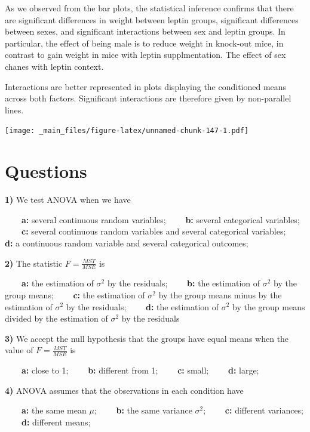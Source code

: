 \documentclass[
]{book}
\begin{document}
As we observed from the bar plots, the statistical inference confirms that there are significant differences in weight between leptin groups, significant differences between sexes, and significant interactions between sex and leptin groups. In particular, the effect of being male is to reduce weight in knock-out mice, in contrast to gain weight in mice with leptin supplmentation. The effect of sex chanes with leptin context.

Interactions are better represented in plots displaying the conditioned means across both factors. Significant interactions are therefore given by non-parallel lines.

\texttt{[image: \_main\_files/figure-latex/unnamed-chunk-147-1.pdf]}

\hypertarget{questions-13}{%
\section{Questions}\label{questions-13}}

\textbf{1)} We test ANOVA when we have

\textbf{\(\qquad\)a:} several continuous random variables;
\textbf{\(\qquad\)b:} several categorical variables;
\textbf{\(\qquad\)c:} several continuous random variables and several categorical variables;
\textbf{\(\qquad\)d:} a continuous random variable and several categorical outcomes;

\textbf{2)} The statistic \(F=\frac{MST}{MSE}\) is

\textbf{\(\qquad\)a:} the estimation of \(\sigma^2\) by the residuals;
\textbf{\(\qquad\)b:} the estimation of \(\sigma^2\) by the group means;
\textbf{\(\qquad\)c:} the estimation of \(\sigma^2\) by the group means minus by the estimation of \(\sigma^2\) by the residuals;
\textbf{\(\qquad\)d:} the estimation of \(\sigma^2\) by the group means divided by the estimation of \(\sigma^2\) by the residuals

\textbf{3)} We accept the null hypothesis that the groups have equal means when the value of \(F=\frac{MST}{MSE}\) is

\textbf{\(\qquad\)a:} close to 1;
\textbf{\(\qquad\)b:} different from 1;
\textbf{\(\qquad\)c:} small;
\textbf{\(\qquad\)d:} large;

\textbf{4)} ANOVA assumes that the observations in each condition have

\textbf{\(\qquad\)a:} the same mean \(\mu\);
\textbf{\(\qquad\)b:} the same variance \(\sigma^2\);
\textbf{\(\qquad\)c:} different variances;
\textbf{\(\qquad\)d:} different means;
\end{document}
